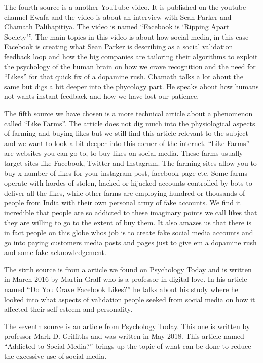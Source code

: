 \documentclass[11pt]{article}
\begin{document}
The fourth source \cite{youtube2} is a another YouTube video. It is published on
the youtube channel Ewafa and the video is about an interview with Sean Parker and
Chamath Palihapitiya. The video is named “Facebook is ‘Ripping Apart Society’”. The
main topics in this video is about how social media, in this case Facebook is creating
what Sean Parker is describing as a social validation feedback loop and how the big
companies are tailoring their algorithms to exploit the psychology of the human brain
on how we crave recognition and the need for “Likes” for that quick fix of a dopamine
rush. Chamath talks a lot about the same but digs a bit deeper into the phycology part.
He speaks about how humans not wants instant feedback and how we have lost our patience.

The fifth source \cite{benthamsgaze} we have chosen is a more technical article about
a phenomenon called “Like Farms”. The article does not dig much into the physiological
aspects of farming and buying likes but we still find this article relevant to the
subject and we want to look a bit deeper into this corner of the internet. “Like Farms”
are websites you can go to, to buy likes on social media. These farms usually target
sites like Facebook, Twitter and Instagram. The farming sites allow you to buy x number
of likes for your instagram post, facebook page etc. Some farms operate with hordes of
stolen, hacked or hijacked accounts controlled by bots to deliver all the likes, while
other farms are employing hundred or thousands of people from India with their own
personal army of fake accounts. We find it incredible that people are so addicted to
these imaginary points we call likes that they are willing to go to the extent of buy
them. It also amazes us that there is in fact people on this globe whos job is to create
fake social media accounts and go into paying customers media posts and pages just to
give em a dopamine rush and some fake acknowledgement.

The sixth source \cite{psychologytoday1} is from a article we found on Psychology Today
and is written in March 2016 by Martin Graff who is a professor in digital love. In his
article named “Do You Crave Facebook Likes?” he talks about his study where he looked
into what aspects of validation people seeked from social media on how it affected
their self-esteem and personality.

The seventh source \cite{psychologytoday2} is an article from Psychology Today. This
one is written by professor Mark D. Griffiths and was written in May 2018. This article
named “Addicted to Social Media?” brings up the topic of what can be done to reduce the
excessive use of social media.
\end{document}
